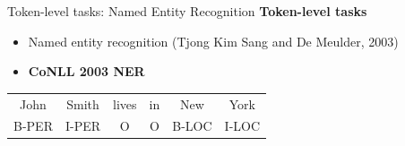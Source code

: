 \documentclass[serif, aspectratio=169]{beamer}
\begin{document}
\begin{frame}{Token-level tasks: Named Entity Recognition}
    \textbf{Token-level tasks}
    
    \vspace{0.5cm}
    
    \begin{itemize}
        \item Named entity recognition (\textcolor{green!50!black}{Tjong Kim Sang and De Meulder, 2003})
    \end{itemize}
    
    \vspace{0.3cm}
    
    \begin{itemize}
        \item[] \setlength{\fboxsep}{2pt}\colorbox{yellow!30}{\textbf{CoNLL 2003 NER}}
    \end{itemize}
    
    \vspace{0.3cm}
    
    \begin{center}
        \begin{tabular}{c c c c c c}
            John & Smith & lives & in & New & York \\
            B-PER & I-PER & O & O & B-LOC & I-LOC
        \end{tabular}
    \end{center}
    
\end{frame}
\end{document}
